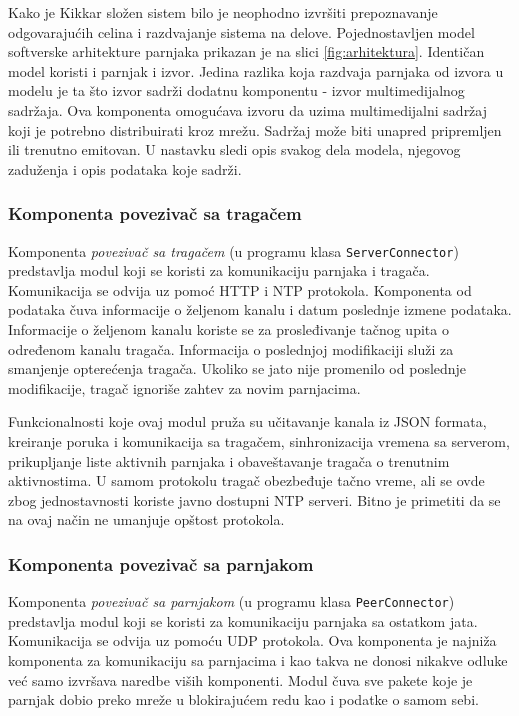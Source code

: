 \documentclass[12pt,oneside]{memoir}
\begin{document}
Kako je Kikkar složen sistem bilo je neophodno izvršiti prepoznavanje odgovarajućih celina i razdvajanje sistema na delove. Pojednostavljen model softverske arhitekture parnjaka prikazan je na slici \ref{fig:arhitektura}. Identičan model koristi i parnjak i izvor. Jedina razlika koja razdvaja parnjaka od izvora u modelu je ta što izvor sadrži dodatnu komponentu - izvor multimedijalnog sadržaja. Ova komponenta omogućava izvoru da uzima multimedijalni sadržaj koji je potrebno distribuirati kroz mrežu. Sadržaj može biti unapred pripremljen ili trenutno emitovan. U nastavku sledi opis svakog dela modela, njegovog zaduženja i opis podataka koje sadrži.


\subsubsection{Komponenta povezivač sa tragačem}
\label{implementacija.2.3.1}

Komponenta \textit{povezivač sa tragačem} (u programu klasa \texttt{ServerConnector}) predstavlja modul koji se koristi za komunikaciju parnjaka i tragača. Komunikacija se odvija uz pomoć HTTP i NTP protokola. Komponenta od podataka čuva informacije o željenom kanalu i datum poslednje izmene podataka. Informacije o željenom kanalu koriste se za prosleđivanje tačnog upita o određenom kanalu tragača. Informacija o poslednjoj modifikaciji služi za smanjenje opterećenja tragača. Ukoliko se jato nije promenilo od poslednje modifikacije, tragač ignoriše zahtev za novim parnjacima. 

Funkcionalnosti koje ovaj modul pruža su učitavanje kanala iz JSON formata, kreiranje poruka i komunikacija sa tragačem, sinhronizacija vremena sa serverom, prikupljanje liste aktivnih parnjaka i obaveštavanje tragača o trenutnim aktivnostima. U samom protokolu tragač obezbeđuje tačno vreme, ali se ovde zbog jednostavnosti koriste javno dostupni NTP serveri. Bitno je primetiti da se na ovaj način ne umanjuje opštost protokola.  


\subsubsection{Komponenta povezivač sa parnjakom}
\label{implementacija.2.3.2}

Komponenta \textit{povezivač sa parnjakom} (u programu klasa \texttt{PeerConnector}) predstavlja modul koji se koristi za komunikaciju parnjaka sa ostatkom jata. Komunikacija se odvija uz pomoću UDP protokola. Ova komponenta je najniža komponenta za komunikaciju sa parnjacima i kao takva ne donosi nikakve odluke već samo izvršava naredbe viših komponenti. Modul čuva sve pakete koje je parnjak dobio preko mreže u blokirajućem redu kao i podatke o samom sebi.
\end{document}
